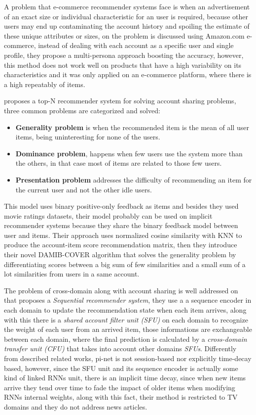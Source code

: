 \documentclass[ecp,tc,english]{iiufrgs}
\begin{document}
A problem that e-commerce recommender systems face is when an advertisement of an exact size or individual characteristic for an user is required, because other users may end up contaminating the account history and spoiling the estimate of these unique attributes or sizes, on \cite{sembium2018} the problem is discussed using Amazon.com e-commerce, instead of dealing with each account as a specific user and single profile, they propose a multi-persona approach boosting the accuracy, however, this method does not work well on products that have a high variability on its characteristics and it was only applied on an e-commerce platform, where there is a high repeatably of items.

\cite{verstrepen2015} proposes a top-N recommender system for solving account sharing problems, three common problems are categorized and solved:
\begin{itemize}
    \item \textbf{Generality problem} is when the recommended item is the mean of all user items, being uninteresting for none of the users.
    \item \textbf{Dominance problem}, happens when few users use the system more than the others, in that case most of items are related to those few users.
    \item \textbf{Presentation problem} addresses the difficulty of recommending an item for the current user and not the other idle users.
\end{itemize}

This model uses binary positive-only feedback as items and besides they used movie ratings datasets, their model probably can be used on implicit recommender systems because they share the binary feedback model between user and items.
Their approach uses normalized cosine similarity with KNN \cite{fix1951} to produce the account-item score recommendation matrix, then they introduce their novel DAMIB-COVER algorithm that solves the generality problem by differentiating scores between a big sum of few similarities and a small sum of a lot similarities from users in a same account.

The problem of cross-domain along with account sharing is well addressed on \cite{ma2019} that proposes a \textit{Sequential recommender system}, they use a a sequence encoder in each domain to update the recommendation state when each item arrives, along with this there is a \textit{shared account filter unit (SFU)} on each domain to recognize the weight of each user from an arrived item, those informations are exchangeable between each domain, where the final prediction is calculated by a \textit{cross-domain transfer unit (CFU)} that takes into account other domains \textit{SFUs}. Differently from described related works, pi-net is not session-based nor explicitly time-decay based, however, since the SFU unit and its sequence encoder is actually some kind of linked RNNs unit, there is an implicit time decay, since when new items arrive they tend over time to fade the impact of older items when modifying RNNs internal weights, along with this fact, their method is restricted to TV domains and they do not address news articles.
\end{document}
